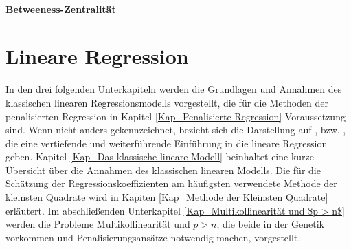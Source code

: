 \documentclass[12pt, a4paper]{report}\usepackage[]{graphicx}\usepackage[]{color}
\begin{document}
\paragraph*{Betweeness-Zentralität}\label{Kap_Betweeness-Zentralität}



\section{Lineare Regression}\label{Kap_Lineare Regression}
In den drei folgenden Unterkapiteln werden die Grundlagen und Annahmen des klassischen linearen Regressionsmodells vorgestellt, die für die Methoden der penalisierten Regression in Kapitel \ref{Kap_Penalisierte Regression} Voraussetzung sind. Wenn nicht anders gekennzeichnet, bezieht sich die Darstellung auf ,  bzw. , die eine vertiefende und weiterführende Einführung in die lineare Regression geben. Kapitel \ref{Kap_Das klassische lineare Modell} beinhaltet eine kurze Übersicht über die Annahmen des klassischen linearen Modells. Die für die Schätzung der Regressionskoeffizienten am häufigsten verwendete Methode der kleinsten Quadrate wird in Kapiten \ref{Kap_Methode der Kleinsten Quadrate} erläutert. Im abschließenden Unterkapitel \ref{Kap_Multikollinearität und $p > n$} werden die Probleme Multikollinearität und $p > n$, die beide in der Genetik vorkommen und Penalisierungsansätze notwendig machen, vorgestellt.

\begin{comment}
$\mathbf{X}$ sind ZVs\\
$\mathbf{y}$ ist eine kontinuierliche ZVs
\end{comment}
\end{document}
